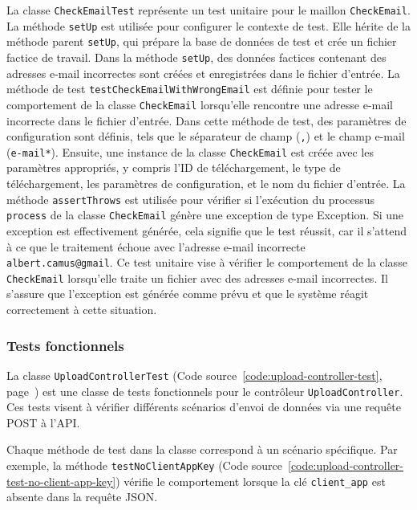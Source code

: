 La classe \Verb|CheckEmailTest| représente un test unitaire pour le maillon \Verb|CheckEmail|. La méthode \Verb|setUp| est utilisée pour configurer le contexte de test. Elle hérite de la méthode parent \Verb|setUp|, qui prépare la base de données de test et crée un fichier factice de travail. Dans la méthode \Verb|setUp|, des données factices contenant des adresses e-mail incorrectes sont créées et enregistrées dans le fichier d'entrée. La méthode de test \Verb|testCheckEmailWithWrongEmail| est définie pour tester le comportement de la classe \Verb|CheckEmail| lorsqu'elle rencontre une adresse e-mail incorrecte dans le fichier d'entrée. Dans cette méthode de test, des paramètres de configuration sont définis, tels que le séparateur de champ (\Verb|,|) et le champ e-mail (\Verb|e-mail*|). Ensuite, une instance de la classe \Verb|CheckEmail| est créée avec les paramètres appropriés, y compris l'ID de téléchargement, le type de téléchargement, les paramètres de configuration, et le nom du fichier d'entrée. La méthode \Verb|assertThrows| est utilisée pour vérifier si l'exécution du processus \Verb|process| de la classe \Verb|CheckEmail| génère une exception de type Exception. Si une exception est effectivement générée, cela signifie que le test réussit, car il s'attend à ce que le traitement échoue avec l'adresse e-mail incorrecte \Verb|albert.camus@gmail|. Ce test unitaire vise à vérifier le comportement de la classe \Verb|CheckEmail| lorsqu'elle traite un fichier avec des adresses e-mail incorrectes. Il s'assure que l'exception est générée comme prévu et que le système réagit correctement à cette situation.

\subsubsection{Tests fonctionnels}

La classe \Verb|UploadControllerTest| (Code source~\ref{code:upload-controller-test}, page~\pageref{code:upload-controller-test}) est une classe de tests fonctionnels pour le contrôleur \Verb|UploadController|. Ces tests visent à vérifier différents scénarios d'envoi de données via une requête POST à l'API.

Chaque méthode de test dans la classe correspond à un scénario spécifique. Par exemple, la méthode \Verb|testNoClientAppKey| (Code source~\ref{code:upload-controller-test-no-client-app-key}) vérifie le comportement lorsque la clé \Verb|client_app| est absente dans la requête JSON.


